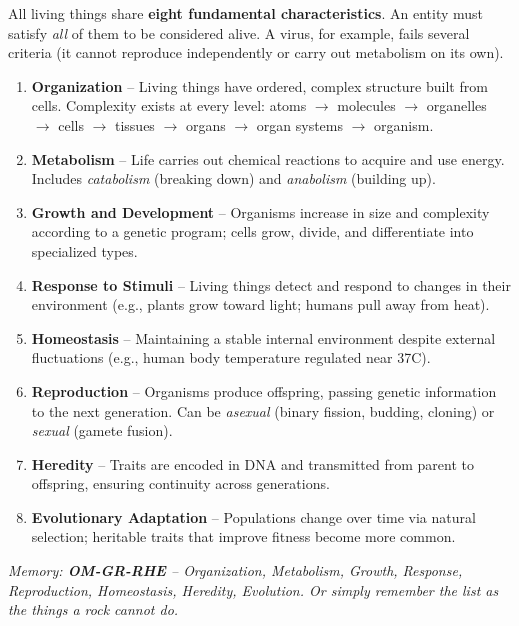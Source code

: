 \documentclass[11pt, letterpaper]{article}
\begin{document}
All living things share \textbf{eight fundamental characteristics}. An entity must satisfy
\emph{all} of them to be considered alive. A virus, for example, fails several criteria
(it cannot reproduce independently or carry out metabolism on its own).

\begin{tcolorbox}[colback=part2bg, colframe=sectiongreen, arc=3pt, boxrule=1pt]
\begin{enumerate}[noitemsep, leftmargin=*]
  \item \textbf{Organization} -- Living things have ordered, complex structure built from cells.
        Complexity exists at every level: atoms $\to$ molecules $\to$ organelles $\to$ cells $\to$
        tissues $\to$ organs $\to$ organ systems $\to$ organism.
  \item \textbf{Metabolism} -- Life carries out chemical reactions to acquire and use energy.
        Includes \emph{catabolism} (breaking down) and \emph{anabolism} (building up).
  \item \textbf{Growth and Development} -- Organisms increase in size and complexity according
        to a genetic program; cells grow, divide, and differentiate into specialized types.
  \item \textbf{Response to Stimuli} -- Living things detect and respond to changes in their
        environment (e.g., plants grow toward light; humans pull away from heat).
  \item \textbf{Homeostasis} -- Maintaining a stable internal environment despite external
        fluctuations (e.g., human body temperature regulated near 37\textdegree C).
  \item \textbf{Reproduction} -- Organisms produce offspring, passing genetic information to
        the next generation. Can be \emph{asexual} (binary fission, budding, cloning) or
        \emph{sexual} (gamete fusion).
  \item \textbf{Heredity} -- Traits are encoded in DNA and transmitted from parent to offspring,
        ensuring continuity across generations.
  \item \textbf{Evolutionary Adaptation} -- Populations change over time via natural selection;
        heritable traits that improve fitness become more common.
\end{enumerate}
\end{tcolorbox}
\textit{Memory: \textbf{OM-GR-RHE} -- Organization, Metabolism, Growth, Response,
Reproduction, Homeostasis, Heredity, Evolution. Or simply remember the list as the things
a rock cannot do.}
\end{document}
